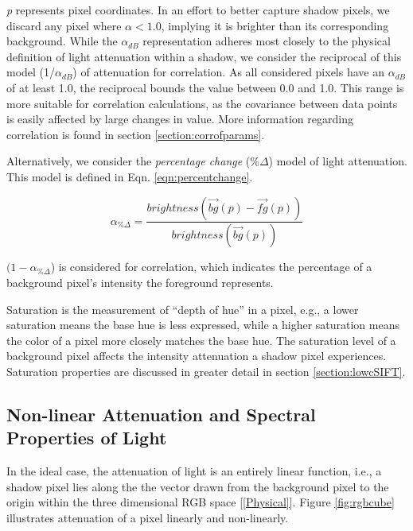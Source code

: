 \textit{p} represents pixel coordinates. In an effort to better capture shadow pixels, we discard any pixel where $\alpha < 1.0$, implying it is brighter than its corresponding background. While the $\alpha_{dB}$ representation adheres most closely to the physical definition of light attenuation within a shadow, we consider the reciprocal of this model (1/$\alpha_{dB}$) of attenuation for correlation. As all considered pixels have an $\alpha_{dB}$ of at least 1.0, the reciprocal bounds the value between 0.0 and 1.0. This range is more suitable for correlation calculations, as the covariance between data points is easily affected by large changes in value. More information regarding correlation is found in section \ref{section:corrofparams}.

Alternatively, we consider the \textit{percentage change} (\%$\Delta$) model of light attenuation. This model is defined in Eqn. \ref{eqn:percentchange}.

\begin{equation}
\alpha_{\%\Delta} = \dfrac{brightness(\vec{bg}(p) - \vec{fg}(p))}{brightness(\vec{bg}(p))}
\label{eqn:percentchange}
\end{equation}

$(1 - \alpha_{\%\Delta}$) is considered for correlation, which indicates the percentage of a background pixel's intensity the foreground represents.

Saturation is the measurement of ``depth of hue'' in a pixel, e.g., a lower saturation means the base hue is less expressed, while a higher saturation means the color of a pixel more closely matches the base hue. The saturation level of a background pixel affects the intensity attenuation a shadow pixel experiences. Saturation properties are discussed in greater detail in section \ref{section:lowcSIFT}.

\subsection{Non-linear Attenuation and Spectral Properties of Light} \label{section:nonlinearatten}

In the ideal case, the attenuation of light is an entirely linear function, i.e., a shadow pixel lies along the the vector drawn from the background pixel to the origin within the three dimensional RGB space [\ref{Physical}]. Figure \ref{fig:rgbcube} illustrates attenuation of a pixel linearly and non-linearly.

